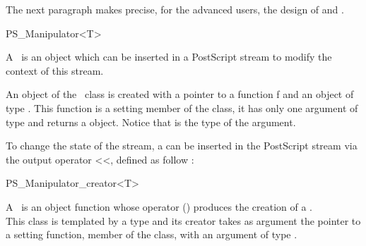 \begin{ccAdvanced}

The next paragraph makes precise, for the advanced users, the design of
 and .


\begin{ccClassTemplate}{PS_Manipulator<T>}

A \ccClassTemplateName\ is an object which can be inserted in a
PostScript stream to modify the context of this stream.

An object of the \ccClassTemplateName\ class is created with a pointer
to a function f and an object of type . This 
function is a setting member of the  class, it has only one
argument of type  and returns a  object. Notice
that  is the type of the  argument.

\ccCreation
{}


\end{ccClassTemplate}

To change the state of the stream, a  can be
inserted in the PostScript stream via the output operator <<, defined as follow :


 

\begin{ccClassTemplate}{PS_Manipulator_creator<T>}

A \ccClassTemplateName\ is an object function whose operator ()
produces the creation of a .\\
This class is templated by a type  and its creator takes as
argument the pointer to a setting function, member of the
 class, with an argument of type .

\ccCreation
{}

\ccThreeToTwo






\end{ccClassTemplate}
\end{ccAdvanced}
